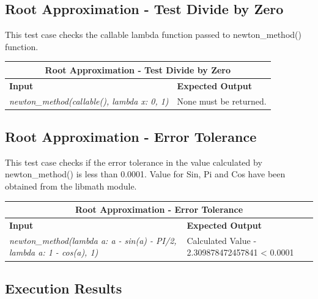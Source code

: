 \subsection{Root Approximation - Test Divide by Zero}
\begin{flushleft}
    This test case checks the callable lambda function passed to newton\_method() function. 
\vspace*{1em}

\begin{tabular}{ |p{6cm}||p{6cm} |  }
    \hline
    \multicolumn{2}{|c|}{\textbf{Root Approximation - Test Divide by Zero}} \\
    \hline
    \textbf{Input} & \textbf{Expected Output}\\
    \hline
    \textit{newton\_method(callable(), lambda x: 0, 1)}   & None must be returned. \\
    \hline
\end{tabular}
\end{flushleft}

\vspace*{1em}
\subsection{Root Approximation - Error Tolerance}
\begin{flushleft}
    This test case checks if the error tolerance in the value calculated by newton\_method() is less than 0.0001. 
    Value for Sin, Pi and Cos have been obtained from the libmath module.
 
\vspace*{1em}

\begin{tabular}{ |p{6cm}||p{6cm} |  }
    \hline
    \multicolumn{2}{|c|}{\textbf{Root Approximation - Error Tolerance}} \\
    \hline
    \textbf{Input} & \textbf{Expected Output}\\
    \hline
    \textit{newton\_method(lambda a: a - sin(a) - PI/2, lambda a: 1 - cos(a), 1)}   & Calculated Value - 2.309878472457841 < 0.0001 \\
    \hline
\end{tabular}
\end{flushleft}
\vspace*{1em}

\subsection{Execution Results}

